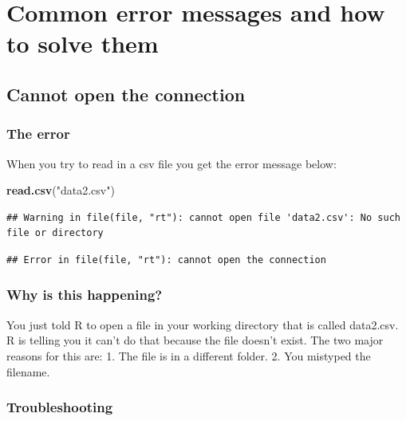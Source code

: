\documentclass[
]{book}
\newenvironment{Shaded}{\begin{snugshade}}{\end{snugshade}}
\newcommand{\FunctionTok}[1]{\textcolor[rgb]{0.13,0.29,0.53}{\textbf{#1}}}
\newcommand{\NormalTok}[1]{#1}
\newcommand{\StringTok}[1]{\textcolor[rgb]{0.31,0.60,0.02}{#1}}
\begin{document}
\section{Common error messages and how to solve them}\label{common-error-messages-and-how-to-solve-them}

\subsection{Cannot open the connection}\label{e1}

\subsubsection*{The error}\label{the-error}

When you try to read in a csv file you get the error message below:

\begin{Shaded}
\begin{Highlighting}[]
\FunctionTok{read.csv}\NormalTok{(}\StringTok{"data2.csv"}\NormalTok{)}
\end{Highlighting}
\end{Shaded}

\begin{verbatim}
## Warning in file(file, "rt"): cannot open file 'data2.csv': No such file or directory
\end{verbatim}

\begin{verbatim}
## Error in file(file, "rt"): cannot open the connection
\end{verbatim}

\subsubsection*{Why is this happening?}\label{why-is-this-happening}

You just told R to open a file in your working directory that is called data2.csv. R is telling you it can't do that because the file doesn't exist. The two major reasons for this are:
1. The file is in a different folder.
2. You mistyped the filename.

\subsubsection*{Troubleshooting}\label{troubleshooting}
\end{document}
